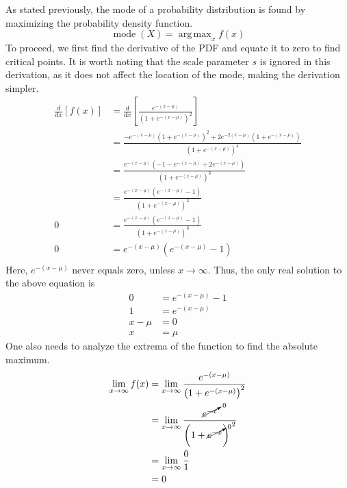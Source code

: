 \documentclass[titlepage,12 pt]{article}
\DeclareMathOperator*{\argmax}{arg\,max}
\DeclareMathOperator*{\mode}{mode}
\begin{document}
As stated previously, the mode of a probability distribution is found by maximizing the probability density function.
\[
    \mode(X) = \argmax_{x} f(x)
\]
To proceed, we first find the derivative of the PDF and equate it to zero to find critical points. It is worth noting that
the scale parameter $s$ is ignored in this derivation, as it does not affect the location of the mode,
making the derivation simpler.
\begin{align*}
    \frac{d}{dx} [f(x)] & = \frac{d}{dx} \left[ \frac{e^{-(x-\mu)}}{\left(1 + e^{-(x-\mu)}\right)^2} \right] \\
                        & = \frac{-e^{-(x-\mu)} \left(1 + e^{-(x-\mu)}\right)^{2}
                        + 2e^{-2(x-\mu)}\left(1 + e^{-(x-\mu)}\right)}{\left(1 + e^{-(x-\mu)}\right)^4} \\
                        &  = \frac{e^{-(x-\mu)}\left(- 1 - e^{-(x-\mu)} + 2e^{-(x-\mu)} \right)}{\left(1 + e^{-(x-\mu)}\right)^3} \\
                        & = \frac{e^{-(x-\mu)}\left(e^{-(x-\mu)} - 1\right)}{\left(1 + e^{-(x-\mu)}\right)^3} \\
    0 & = \frac{e^{-(x-\mu)}\left(e^{-(x-\mu)} - 1\right)}{\left(1 + e^{-(x-\mu)}\right)^3} \\
    0 & = e^{-(x-\mu)}\left(e^{-(x-\mu)} - 1\right) \\
\end{align*}
Here, $e^{-(x-\mu)}$ never equals zero, unless $x \to \infty$. Thus, the only real solution to the above equation is
\begin{align*}
    0 & = e^{-(x-\mu)} - 1 \\
    1 & = e^{-(x-\mu)} \\
    x - \mu & = 0 \\
    x & = \mu
\end{align*}
One also needs to analyze the extrema of the function to find the absolute maximum.
\begin{align*}
    \lim_{x\to\infty} f(x) & = \lim_{x\to\infty} \frac{e^{-(x-\mu)}}{\left(1 + e^{-(x-\mu)}\right)^2} \\
                           & = \lim_{x\to\infty} \frac{\cancelto{0}{e^{-x}}}{\left(1 + \cancelto{0}{e^{-x}}\right)^{\; 2}} \\
                           & = \lim_{x\to\infty} \frac{0}{1} \\
                           & = 0 \\
\end{align*}
\end{document}
